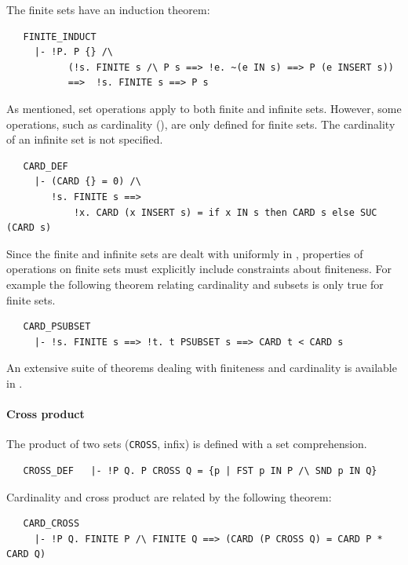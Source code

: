 {\medskip\noindent
The finite sets have an induction theorem:
%
%
\begin{hol}
\begin{verbatim}
   FINITE_INDUCT
     |- !P. P {} /\
           (!s. FINITE s /\ P s ==> !e. ~(e IN s) ==> P (e INSERT s))
           ==>  !s. FINITE s ==> P s
\end{verbatim}
\end{hol}
%
As mentioned, set operations apply to both finite and infinite
sets. However, some operations, such as cardinality
(), are only defined for finite sets.  The
cardinality of an infinite set is not specified.
%
\begin{hol}
\begin{verbatim}
   CARD_DEF
     |- (CARD {} = 0) /\
        !s. FINITE s ==>
            !x. CARD (x INSERT s) = if x IN s then CARD s else SUC (CARD s)
\end{verbatim}
\end{hol}
%
Since the finite and infinite sets are dealt with uniformly in
, properties of operations on finite sets must
explicitly include constraints about finiteness. For example the
following theorem relating cardinality and subsets is only true for
finite sets.
%
\begin{hol}
\begin{verbatim}
   CARD_PSUBSET
     |- !s. FINITE s ==> !t. t PSUBSET s ==> CARD t < CARD s
\end{verbatim}
\end{hol}
%
An extensive suite of theorems dealing with finiteness and cardinality
is available in .

\paragraph{Cross product}
The product of two sets ({\small\verb+CROSS+}, infix) is defined
with a set comprehension.
%
\begin{hol}
\begin{verbatim}
   CROSS_DEF   |- !P Q. P CROSS Q = {p | FST p IN P /\ SND p IN Q}
\end{verbatim}
\end{hol}
%
\noindent Cardinality and cross product are related by the following theorem:
\begin{hol}
\begin{verbatim}
   CARD_CROSS
     |- !P Q. FINITE P /\ FINITE Q ==> (CARD (P CROSS Q) = CARD P * CARD Q)
\end{verbatim}
\end{hol}

}
